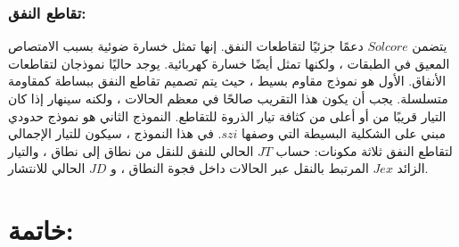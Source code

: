 \subsubsection{تقاطع النفق:}
يتضمن $ Solcore $ دعمًا جزئيًا لتقاطعات النفق. إنها تمثل خسارة ضوئية بسبب الامتصاص المعيق في الطبقات ، ولكنها تمثل أيضًا خسارة كهربائية. يوجد حاليًا نموذجان لتقاطعات الأنفاق. الأول هو نموذج مقاوم بسيط ، حيث يتم تصميم تقاطع النفق ببساطة كمقاومة متسلسلة. يجب أن يكون هذا التقريب صالحًا في معظم الحالات ، ولكنه سينهار إذا كان التيار قريبًا من أو أعلى من كثافة تيار الذروة للتقاطع.
النموذج الثاني هو نموذج حدودي مبني على الشكلية البسيطة التي وصفها $ szi $. في هذا النموذج ، سيكون للتيار الإجمالي لتقاطع النفق ثلاثة مكونات: حساب $ JT $ الحالي للنفق للنقل من نطاق إلى نطاق ، والتيار الزائد $ Jex $ المرتبط بالنقل عبر الحالات داخل فجوة النطاق ، و $ JD $ الحالي للانتشار.


\section{خاتمة:}






















